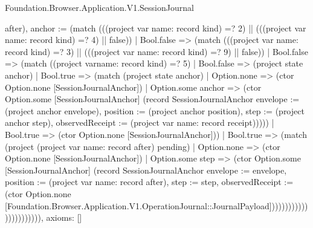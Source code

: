 \begin{lexlean}{Foundation.Browser.Application.V1.SessionJournal}
\begin{semanticmodule}
{{{                                } after), anchor := (match (((project var{
                                    name: record
                                  } kind) =? 2) || (((project var{
                                    name: record
                                  } kind) =? 4) || false))
                                  | Bool.false => (match (((project var{
                                      name: record
                                    } kind) =? 3) || (((project var{
                                      name: record
                                    } kind) =? 9) || false))
                                    | Bool.false => (match ((project var{name: record} kind) =? 5)
                                      | Bool.false => (project state anchor)
                                      | Bool.true => (match (project state anchor)
                                        | Option.none => (ctor Option.none [SessionJournalAnchor])
                                        | Option.some anchor => (ctor Option.some [SessionJournalAnchor] (record SessionJournalAnchor {envelope := (project anchor envelope), position := (project anchor position), step := (project anchor step), observedReceipt := (project var{
                                          name: record
                                        } receipt)}))))
                                    | Bool.true => (ctor Option.none [SessionJournalAnchor]))
                                  | Bool.true => (match (project (project var{
                                      name: record
                                    } after) pending)
                                    | Option.none => (ctor Option.none [SessionJournalAnchor])
                                    | Option.some step => (ctor Option.some [SessionJournalAnchor] (record SessionJournalAnchor {envelope := envelope, position := (project var{
                                      name: record
                                    } after), step := step, observedReceipt := (ctor Option.none [Foundation.Browser.Application.V1.OperationJournal::JournalPayload])}))))}))))))))))))))))),
  axioms: []
}


\end{semanticmodule}
\end{lexlean}
